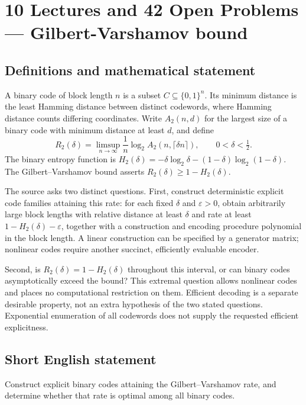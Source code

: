 \documentclass[11pt,a4paper]{article}
\begin{document}
\section*{10 Lectures and 42 Open Problems — Gilbert-Varshamov bound}\label{statement}

\subsection{Definitions and mathematical statement}
A binary code of block length $n$ is a subset $C\subseteq\{0,1\}^n$.
Its minimum distance is the least Hamming distance between distinct
codewords, where Hamming distance counts differing coordinates.
Write $A_2(n,d)$ for the largest size of a binary code with minimum
distance at least $d$, and define
\[
 R_2(\delta)=\limsup_{n\to\infty}
            \frac1n\log_2 A_2(n,\lceil\delta n\rceil),
 \qquad 0<\delta<\tfrac12.
\]
The binary entropy function is
$H_2(\delta)=-\delta\log_2\delta-(1-\delta)\log_2(1-\delta)$.
The Gilbert--Varshamov bound asserts $R_2(\delta)\ge1-H_2(\delta)$.

The source asks two distinct questions. First, construct deterministic
explicit code families attaining this rate: for each fixed $\delta$
and $\varepsilon>0$, obtain arbitrarily large block lengths with
relative distance at least $\delta$ and rate at least
$1-H_2(\delta)-\varepsilon$, together with a construction and encoding
procedure polynomial in the block length. A linear construction can
be specified by a generator matrix; nonlinear codes require another
succinct, efficiently evaluable encoder.

Second, is $R_2(\delta)=1-H_2(\delta)$ throughout this interval, or can
binary codes asymptotically exceed the bound? This extremal question
allows nonlinear codes and places no computational restriction on
them. Efficient decoding is a separate desirable property, not an
extra hypothesis of the two stated questions. Exponential enumeration
of all codewords does not supply the requested efficient explicitness.
\subsection{Short English statement}
Construct explicit binary codes attaining the Gilbert–Varshamov rate, and determine whether that rate is optimal among all binary codes.
\end{document}

